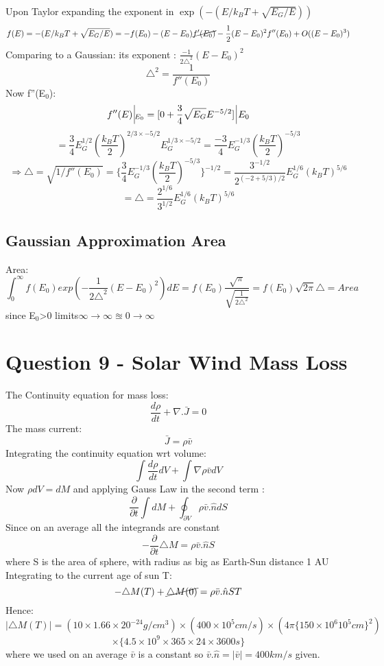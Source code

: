 \documentclass[11pt]{article}
\begin{document}
	Upon Taylor expanding the exponent in \(\exp(-(E/k_BT + \sqrt{E_G/E}))\)
	\[
		f(E) = -(E/k_BT + \sqrt{E_G/E}) = -f(E_0) - (E-E_0)\cancel{f'(E_0)} - \frac{1}{2}(E-E_0)^2 f''(E_0) + O((E-E_0)^3)
	\]
	Comparing to a Gaussian: its exponent : \(\frac{-1}{2\triangle^2}(E-E_0)^2\)
	\[
		\triangle^2 = \frac{1}{f''(E_0)}
	\]
	Now f''(E$_0$):
	\[
		f''(E) \, \vline_{E_0} = [0 + \frac{3}{4}\sqrt{E_G}E^{-5/2}]\, \vline{\, E_0}
	\]
	\[
		 = \frac{3}{4}E_G^{1/2} (\frac{k_BT}{2})^{2/3 \times -5/2} E_G^{1/3 \times -5/2} = \frac{-3}{4}E_G^{-1/3}(\frac{k_BT}{2})^{-5/3}
	\]
	\[
		\Rightarrow \triangle = \sqrt{1/f''(E_0)} =\{\frac{3}{4}E_G^{-1/3}(\frac{k_BT}{2})^{-5/3}\}^{-1/2} = \frac{3^{-1/2}}{2^{(-2+5/3)/2}}E_G^{1/6}(k_BT)^{5/6}
	\]
	\[
		= \boxed{\triangle = \frac{2^{1/6}}{3^{1/2}}E_G^{1/6}(k_BT)^{5/6}}
	\]
	
	\subsection{Gaussian Approximation Area}
	
	Area:
	\[
		\int_{0}^{\infty} f(E_0) exp(-\frac{1}{2\triangle^2}(E-E_0)^2) dE = f(E_0)\frac{\sqrt{\pi}}{\sqrt{\frac{1}{2\triangle^2}}} = \boxed{f(E_0)\sqrt{2\pi}\triangle = Area}
	\]
	since E$_0$>0 limits$\infty\rightarrow\infty \approxeq 0\rightarrow \infty$ 
	
	\section{\color{teal} Question 9 - Solar Wind Mass Loss}

	The Continuity equation for mass loss:
	\[
		\frac{d\rho}{dt} + \nabla.\bar{J} = 0
	\]
	The mass current:
	\[
		\bar{J} = \rho \bar{v} 
	\]
	Integrating the continuity equation wrt volume:
	\[
		\int \frac{d\rho}{dt}dV + \int \nabla \rho \bar{v} dV
	\]
	Now  \(\rho dV = dM \) and applying Gauss Law in the second term :
	\[
		\frac{\partial}{\partial t} \int dM + \oint_{\partial V} \rho \bar{v}.\hat{n} dS 
	\]
	Since on an average all the integrands are constant
	\[
		-\frac{\partial}{\partial t} \triangle M = \rho \bar{v}.\hat{n} S
	\]
	where S is the area of sphere, with radius as big as Earth-Sun distance 1 AU\\
	Integrating to the current age of sun T:
	\[
		-\triangle M(T)+\cancel{\triangle M(0)} = \rho \bar{v}.\hat{n} S T
	\]
	Hence:
	\[
		|\triangle M(T)| = (10 \times 1.66 \times 20^{-24} g/cm^3) \times (400 \times 10^5 cm/s) \times (4\pi \{150 \times 10^6 10^5 cm\}^2)
	\]
	\[
		 \times \{4.5 \times 10^9 \times 365 \times 24 \times 3600 s\}
	\]
	where we used on an average $\bar{v}$ is a constant so $\bar{v}.\hat{n} = |\bar{v}| = 400 km/s$ given.\\
	
\end{document}
